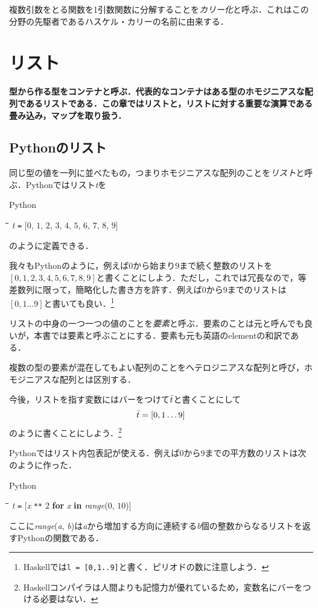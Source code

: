 \documentclass[twocolumn]{jsbook}
\newcommand{\keyword}[1]{{\emph{#1}}}
\newcommand{\code}[1]{\texttt{#1}}
\newenvironment{leader}{\begingroup\bf}{\endgroup}
\newenvironment{pythoncode}{\begin{itembox}[r]{Python}}{\end{itembox}}
\newenvironment{python}{\begin{tabbing}\hspace*{1em}\=\hspace*{1em}\=\hspace*{1em}\=\hspace*{1em}\=\kill}{\end{tabbing}}
\newcommand{\pthnId}[1]{\textit{#1}}
\newcommand{\pthnKeyword}[1]{\textbf{#1}}
\newcommand{\pthnOp}[1]{\texttt{#1}}
\newcommand{\hsklList}[1]{\Bar{#1}}
\begin{document}
複数引数をとる関数を1引数関数に分解することを\keyword{カリー化}と呼ぶ．これはこの分野の先駆者であるハスケル・カリーの名前に由来する．



\chapter{リスト}
\begin{leader}
型から作る型をコンテナと呼ぶ．代表的なコンテナはある型のホモジニアスな配列であるリストである．この章ではリストと，リストに対する重要な演算である畳み込み，マップを取り扱う．
\end{leader}


\section{Pythonのリスト}

同じ型の値を一列に並べたもの，つまりホモジニアスな配列のことを\keyword{リスト}と呼ぶ．Pythonではリスト\pthnId{t}を
\begin{pythoncode}
\begin{python}
\pthnId{t} \pthnOp{=} [$0$, $1$, $2$, $3$, $4$, $5$, $6$, $7$, $8$, $9$]
\end{python}
\end{pythoncode}
のように定義できる．

我々もPythonのように，例えば$0$から始まり$9$まで続く整数のリストを$[0,1,2,3,4,5,6,7,8,9]$と書くことにしよう．ただし，これでは冗長なので，等差数列に限って，簡略化した書き方を許す．例えば$0$から$9$までのリストは$[0,1\dots9]$と書いても良い．\footnote{Haskellでは\code{l = [0,1..9]}と書く．ピリオドの数に注意しよう．}

リストの中身の一つ一つの値のことを\keyword{要素}と呼ぶ．要素のことは元と呼んでも良いが，本書では要素と呼ぶことにする．要素も元も英語のelementの和訳である．

複数の型の要素が混在してもよい配列のことをヘテロジニアスな配列と呼び，ホモジニアスな配列とは区別する．

今後，リストを指す変数にはバーをつけて$\hsklList{t}$と書くことにして$$\hsklList{t}=[0,1\dots9]$$のように書くことにしよう．\footnote{Haskellコンパイラは人間よりも記憶力が優れているため，変数名にバーをつける必要はない．}

Pythonではリスト内包表記が使える．例えば$0$から$9$までの平方数のリストは次のように作った．
\begin{pythoncode}
\begin{python}
\pthnId{t} \pthnOp{=} [\pthnId{x} \pthnOp{**} $2$ \pthnKeyword{for} \pthnId{x} \pthnKeyword{in} \pthnId{range}($0$, $10$)]
\end{python}
\end{pythoncode}
ここに\pthnId{range}(\pthnId{a}, \pthnId{b})は\pthnId{a}から増加する方向に連続する\pthnId{b}個の整数からなるリストを返すPythonの関数である．
\end{document}
